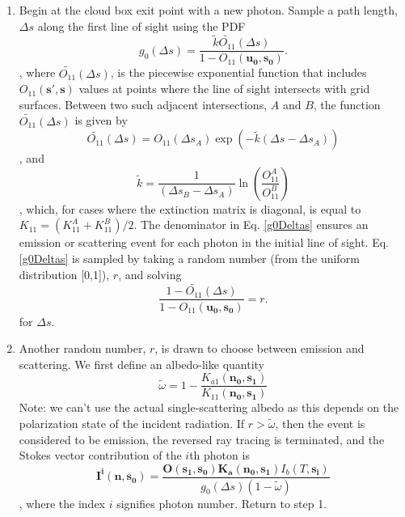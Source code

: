 \begin{enumerate}
\item
Begin at the cloud box exit point with a new photon. Sample a
  path length, $\Delta s$ along the first line of sight using the PDF
\begin{equation}
g_0(\Delta s)=\frac{\tilde{k}\tilde{O_{11}}(\Delta s)}
{1-O_{11}(\mathbf{u_0,s_0})}.
\label{g0Deltas}
\end{equation}
, where $\tilde{O_{11}}(\Delta s)$, is the piecewise exponential
function that includes $O_{11}(\mathbf{s',s})$ values at points
where the line of sight intersects with grid surfaces.
Between two such adjacent intersections, $A$ and $B$, the function
$\tilde{O_{11}}(\Delta s)$ is given by
\begin{equation}
\tilde{O_{11}}(\Delta s)=O_{11}(\Delta s_A)\exp\left(-\tilde{k}\left(\Delta s-\Delta
s_A\right)\right)
\label{O11}
\end{equation}
, and
\begin{equation}
\tilde{k}=\frac{1}{\left(\Delta s_B-\Delta s_A\right)}
\ln\left(\frac{O_{11}^A}{O_{11}^B}\right)
\end{equation}
, which, for cases where the extinction matrix is diagonal, is equal to $K_{11}=(K_{11}^A+K_{11}^B)/2$.
The denominator in Eq. \ref{g0Deltas} ensures an emission or scattering
event for each photon in the initial line of sight.
Eq. \ref{g0Deltas} is sampled by taking a random number (from the
uniform distribution [0,1]), $r$, and solving 
\begin{equation}
\frac{1-\tilde{O_{11}}(\Delta s)}{1-O_{11}(\mathbf{u_0,s_0})}=r.
\end{equation}
for $\Delta s$.
\item
Another random number, $r$, is drawn to choose between emission and scattering.  We first define an albedo-like quantity
\begin{equation}
\tilde{\omega}=1-\frac{K_{a1}(\mathbf{n_{0},s_{1}})}{K_{11}(\mathbf{n_{0},s_{1}})}
\end{equation}
Note: we can't use the actual single-scattering albedo as this depends
on the polarization state of the incident radiation.  If $r>\tilde{\omega}$, then the event is considered to be emission,
the reversed ray tracing is terminated, and the Stokes vector
contribution of the $i$th photon is
\begin{equation}
\mathbf{I^i(n,s_0)}=\frac{\mathbf{O(s_1,s_0)}\mathbf{K_a(n_0,s_1)}
  I_b(T,\mathbf{s_i})}{g_0(\Delta s) \left(1-\tilde{\omega}\right)}
\label{Iemission2}
\end{equation}
, where the index $i$ signifies photon number. Return to step 1.


\end{enumerate}
